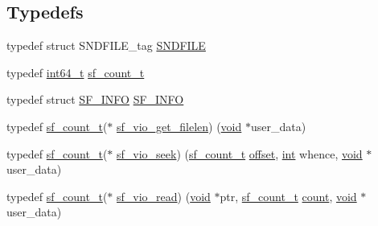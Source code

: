 \subsection*{Typedefs}
\begin{DoxyCompactItemize}
\item 
typedef struct S\+N\+D\+F\+I\+L\+E\+\_\+tag \hyperlink{mac_2config_2i386_2lib-src_2libsndfile_2src_2sndfile_8h_ac14209bc83d532b06a8cdf9ade6d544a}{S\+N\+D\+F\+I\+LE}
\item 
typedef \hyperlink{lib-src_2ffmpeg_2win32_2stdint_8h_a67a9885ef4908cb72ce26d75b694386c}{int64\+\_\+t} \hyperlink{mac_2config_2i386_2lib-src_2libsndfile_2src_2sndfile_8h_a398121a5f562230ea7f772528fff5f84}{sf\+\_\+count\+\_\+t}
\item 
typedef struct \hyperlink{struct_s_f___i_n_f_o}{S\+F\+\_\+\+I\+N\+FO} \hyperlink{mac_2config_2i386_2lib-src_2libsndfile_2src_2sndfile_8h_afa81fd72dadb06b5578575de8e760e47}{S\+F\+\_\+\+I\+N\+FO}
\item 
typedef \hyperlink{mac_2config_2i386_2lib-src_2libsndfile_2src_2sndfile_8h_a398121a5f562230ea7f772528fff5f84}{sf\+\_\+count\+\_\+t}($\ast$ \hyperlink{mac_2config_2i386_2lib-src_2libsndfile_2src_2sndfile_8h_a2166198457fe4e852ef10804b2c1e8a1}{sf\+\_\+vio\+\_\+get\+\_\+filelen}) (\hyperlink{sound_8c_ae35f5844602719cf66324f4de2a658b3}{void} $\ast$user\+\_\+data)
\item 
typedef \hyperlink{mac_2config_2i386_2lib-src_2libsndfile_2src_2sndfile_8h_a398121a5f562230ea7f772528fff5f84}{sf\+\_\+count\+\_\+t}($\ast$ \hyperlink{mac_2config_2i386_2lib-src_2libsndfile_2src_2sndfile_8h_ad23e218718c16eae24b98d41976ac5d2}{sf\+\_\+vio\+\_\+seek}) (\hyperlink{mac_2config_2i386_2lib-src_2libsndfile_2src_2sndfile_8h_a398121a5f562230ea7f772528fff5f84}{sf\+\_\+count\+\_\+t} \hyperlink{layer12_8c_a33d71f23ba2052d17f0b754dc35265b0}{offset}, \hyperlink{xmltok_8h_a5a0d4a5641ce434f1d23533f2b2e6653}{int} whence, \hyperlink{sound_8c_ae35f5844602719cf66324f4de2a658b3}{void} $\ast$user\+\_\+data)
\item 
typedef \hyperlink{mac_2config_2i386_2lib-src_2libsndfile_2src_2sndfile_8h_a398121a5f562230ea7f772528fff5f84}{sf\+\_\+count\+\_\+t}($\ast$ \hyperlink{mac_2config_2i386_2lib-src_2libsndfile_2src_2sndfile_8h_a90c34518e3de9fbed3611b030e17dba7}{sf\+\_\+vio\+\_\+read}) (\hyperlink{sound_8c_ae35f5844602719cf66324f4de2a658b3}{void} $\ast$ptr, \hyperlink{mac_2config_2i386_2lib-src_2libsndfile_2src_2sndfile_8h_a398121a5f562230ea7f772528fff5f84}{sf\+\_\+count\+\_\+t} \hyperlink{metrics_8c_afea6e77db19a2f8c91419904fe665a3a}{count}, \hyperlink{sound_8c_ae35f5844602719cf66324f4de2a658b3}{void} $\ast$user\+\_\+data)

\end{DoxyCompactItemize}
